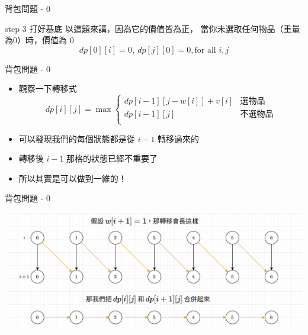 \documentclass[aspectratio=169]{beamer}
\begin{document}
    \begin{frame}{背包問題 - 0}
        \begin{block}{step 3 打好基底}
            以這題來講，因為它的價值皆為正，
            當你未選取任何物品（重量為$0$）時，價值為 $0$
            $$dp[0][i] = 0, \ dp[j][0] = 0, \text{for all } i,j$$
        \end{block}
    \end{frame}

    \begin{frame}{背包問題 - 0}
        \begin{itemize}
            \item 觀察一下轉移式
            $$
            dp[i][j]= \max
            \begin{cases}
                dp[i-1][j-w[i]]+v[i] & \text{選物品} \\
                dp[i-1][j]           & \text{不選物品} \\
            \end{cases}
            $$
            \item<2-> 可以發現我們的每個狀態都是從 $i-1$ 轉移過來的
            \item<3-> 轉移後 $i-1$ 那格的狀態已經不重要了
            \item<4-> 所以其實是可以做到一維的！
        \end{itemize}
    \end{frame}
    
    \begin{frame}{背包問題 - 0}
        \begin{center}
            \includegraphics[scale=0.4]{images/rolling_01_knapsack.png}
        \end{center}
    \end{frame}
    
\end{document}
